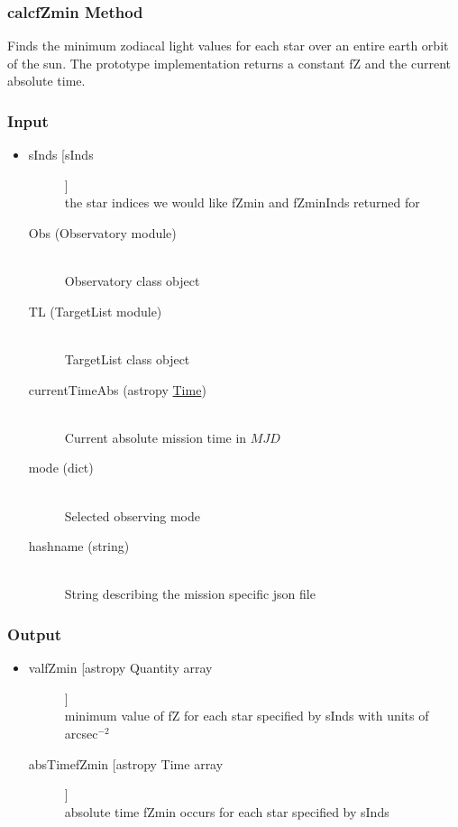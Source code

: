 \documentclass[cleanfoot]{asme2ej}
\begin{document}
\subsubsection{calcfZmin Method} \label{sec:calcfZmintask}
Finds the minimum zodiacal light values for each star over an entire earth orbit of the sun. The prototype implementation returns a constant fZ and the current absolute time.
\subsubsection*{Input}
\begin{itemize}
\item
\begin{description}
    \item[sInds [sInds]] \hfill \\ the star indices we would like fZmin and fZminInds returned for
    \item[Obs (Observatory module)] \hfill \\ Observatory class object
    \item[TL (TargetList module)] \hfill \\ TargetList class object
    \item[currentTimeAbs (astropy \href{http://astropy.readthedocs.org/en/latest/time/index.html}{Time})] \hfill \\ Current absolute mission time in $ MJD $
    \item[mode (dict)] \hfill \\ Selected observing mode
    \item[hashname (string)] \hfill \\ String describing the mission specific json file
\end{description}
\end{itemize}
\subsubsection*{Output}
\begin{itemize}
\item
\begin{description}
    \item[valfZmin [astropy Quantity array]] \hfill \\ minimum value of fZ for each star specified by sInds with units of arcsec$^{-2}$
    \item[absTimefZmin [astropy Time array]] \hfill \\ absolute time fZmin occurs for each star specified by sInds
\end{description}
\end{itemize}
\end{document}
